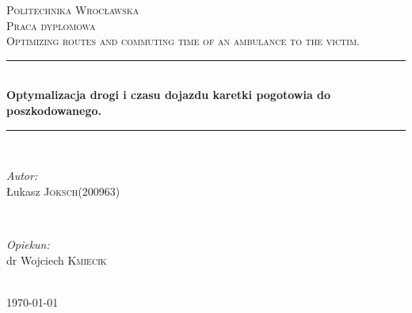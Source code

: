 \documentclass[12pt]{article} %
\begin{document}

\begin{titlepage}

\newcommand{\HRule}{\rule{\linewidth}{0.5mm}} %

\center %

\textsc{\LARGE Politechnika Wrocławska}\\[1.5cm] %
\textsc{\Large Praca dyplomowa}\\[0.5cm] %
\textsc{\large Optimizing routes and commuting time of an ambulance to the victim.}\\[0.5cm] %

\HRule \\[0.4cm]
{ \huge \bfseries 
Optymalizacja drogi i czasu dojazdu karetki pogotowia do poszkodowanego. }\\[0.4cm] %
\HRule \\[1.5cm]

\begin{minipage}{0.4\textwidth}
\begin{flushleft} \large
\emph{Autor:}\\
Łukasz \textsc{Joksch}(200963) \\

\end{flushleft}
\end{minipage}
~
\begin{minipage}{0.4\textwidth}
\begin{flushright} \large
\emph{Opiekun:} \\
dr Wojciech \textsc{Kmiecik} %
\end{flushright}
\end{minipage}\\[4cm]

{\large \today}\\[3cm] %


\vfill %

\end{titlepage}
\end{document}
